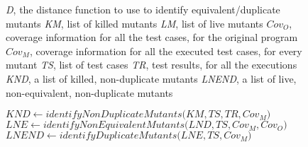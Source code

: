
\renewcommand{\INDA}{5}
\renewcommand{\INDB}{10}
\renewcommand{\INDC}{15}
\newcommand{\INDD}{20}
\newcommand{\INDE}{25}

\renewcommand{\Comment}[1]{\textcolor{darkgray}{\textit{//#1}}}

\begin{figure}[tb]

\begin{algorithmic}[1]

\scriptsize
\Require \emph{D}, the distance function to use to identify equivalent/duplicate mutants
\Require \emph{KM}, list of killed mutants
\Require \emph{LM}, list of live mutants
\Require $\mathit{Cov}_O$, coverage information for all the test cases, for the original program
\Require $\mathit{Cov}_M$, coverage information for all the executed test cases, for every mutant
\Require \emph{TS}, list of test cases
\Require \emph{TR}, test results, for all the executions
\Ensure \emph{KND}, a list of killed, non-duplicate  mutants
\Ensure \emph{LNEND}, a list of live, non-equivalent, non-duplicate mutants

\State $\mathit{KND} \gets \mathit{identifyNonDuplicateMutants(} \mathit{KM}, \mathit{TS}, \mathit{TR}, \mathit{Cov}_M)$ \label{alg:equivalent:KND}
\State $\mathit{LNE} \gets \mathit{identifyNonEquivalentMutants(} \mathit{LND}, \mathit{TS}, \mathit{Cov}_M, \mathit{Cov}_O)$ \label{alg:equivalent:LNE}
\State $\mathit{LNEND} \gets \mathit{identifyDuplicateMutants(} \mathit{LNE}, \mathit{TS}, \mathit{Cov}_M)$ \label{alg:equivalent:LNEND}



\end{algorithmic}
\end{figure}
